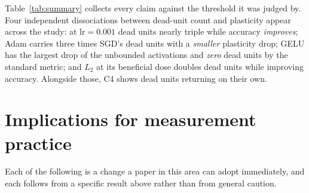 \documentclass[10pt]{article}
\begin{document}
Table~\ref{tab:summary} collects every claim against the threshold it was judged
by. Four independent dissociations between dead-unit count and plasticity appear
across the study: at $\text{lr}=0.001$ dead units nearly triple while accuracy
\emph{improves}; Adam carries three times SGD's dead units with a \emph{smaller}
plasticity drop; GELU has the largest drop of the unbounded activations and
\emph{zero} dead units by the standard metric; and $L_2$ at its beneficial dose
doubles dead units while improving accuracy. Alongside those, C4 shows dead
units returning on their own.

\section{Implications for measurement practice}
\label{sec:practice}

Each of the following is a change a paper in this area can adopt immediately,
and each follows from a specific result above rather than from general caution.
\end{document}
